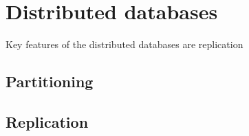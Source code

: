
\section{Distributed databases}\label{sec:theory:distDbs}
Key features of the distributed databases are replication



\subsection{Partitioning}

\subsection{Replication}
